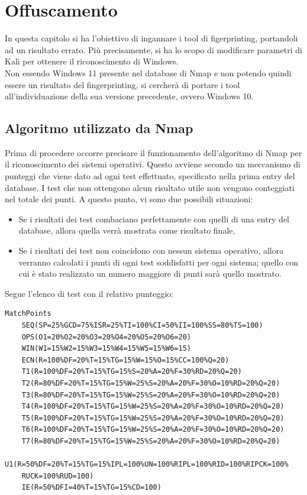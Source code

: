\chapter{Offuscamento}

In questa capitolo si ha l'obiettivo di ingannare i tool di figerprinting, portandoli ad un risultato errato. Più precisamente, si ha lo scopo di modificare parametri di Kali per ottenere il riconoscimento di Windows.
\\
Non essendo Windows 11 presente nel database di Nmap e non potendo quindi essere un risultato del fingerprinting, si cercherà di portare i tool all'individuazione della sua versione precedente, ovvero Windows 10.

\section{Algoritmo utilizzato da Nmap}
Prima di procedere occorre precisare il funzionamento dell'algoritmo di Nmap per il riconoscimento dei sistemi operativi. Questo avviene secondo un meccanismo di punteggi che viene dato ad ogni test effettuato, specificato nella prima entry del database. I test che non ottengono alcun risultato utile non vengono conteggiati nel totale dei punti.
A questo punto, vi sono due possibili situazioni:
\begin{itemize}
	\item Se i risultati dei test combaciano perfettamente con quelli di una entry del database, allora quella verrà mostrata come risultato finale,
	\item Se i risultati dei test non coincidono con nessun sistema operativo, allora verranno calcolati i punti di ogni test soddisfatti per ogni sistema; quello con cui è stato realizzato un numero maggiore di punti sarà quello mostrato.
\end{itemize}

Segue l'elenco di test con il relativo punteggio:

\begin{lstlisting}[caption={Punteggi che Nmap attrribuisce ad ogni test}]
	MatchPoints
	SEQ(SP=25%GCD=75%ISR=25%TI=100%CI=50%II=100%SS=80%TS=100)
	OPS(O1=20%O2=20%O3=20%O4=20%O5=20%O6=20)
	WIN(W1=15%W2=15%W3=15%W4=15%W5=15%W6=15)
	ECN(R=100%DF=20%T=15%TG=15%W=15%O=15%CC=100%Q=20)
	T1(R=100%DF=20%T=15%TG=15%S=20%A=20%F=30%RD=20%Q=20)
	T2(R=80%DF=20%T=15%TG=15%W=25%S=20%A=20%F=30%O=10%RD=20%Q=20)
	T3(R=80%DF=20%T=15%TG=15%W=25%S=20%A=20%F=30%O=10%RD=20%Q=20)
	T4(R=100%DF=20%T=15%TG=15%W=25%S=20%A=20%F=30%O=10%RD=20%Q=20)
	T5(R=100%DF=20%T=15%TG=15%W=25%S=20%A=20%F=30%O=10%RD=20%Q=20)
	T6(R=100%DF=20%T=15%TG=15%W=25%S=20%A=20%F=30%O=10%RD=20%Q=20)
	T7(R=80%DF=20%T=15%TG=15%W=25%S=20%A=20%F=30%O=10%RD=20%Q=20)
	U1(R=50%DF=20%T=15%TG=15%IPL=100%UN=100%RIPL=100%RID=100%RIPCK=100%
	RUCK=100%RUD=100)
	IE(R=50%DFI=40%T=15%TG=15%CD=100)
\end{lstlisting}


